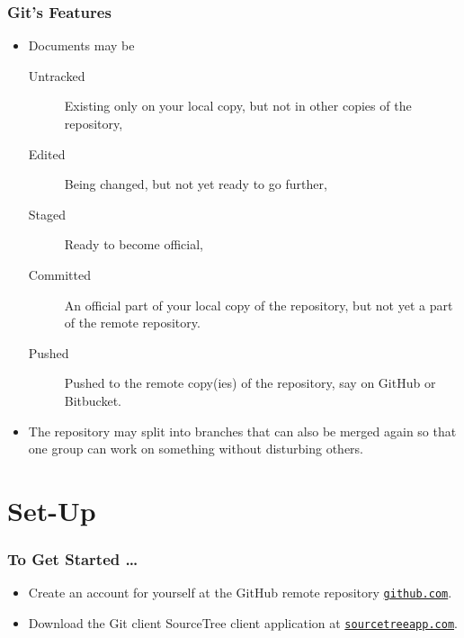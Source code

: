 \documentclass[12pt, compress,xcolor={usenames,dvipsnames}]{beamer} %
\begin{document}
	\begin{frame}\frametitle{Git's Features}

		\vspace{-3ex}
		
		\begin{itemize}
						
			\item Documents may be
			
			\begin{description}
				\item[Untracked] Existing only on your local copy, but not in other copies of the repository,
				
				\item [Edited] Being changed, but not yet ready to go further,
				
				\item[Staged] Ready to become official,
				
				\item[Committed] An official part of your local copy of the repository, but not yet a part of the remote repository.
				
				\item[Pushed] Pushed to the remote copy(ies) of the repository, say on GitHub or Bitbucket.  
			\end{description}
			
			\item The repository may split into \alert{branches} that can also be merged again so that one group can work on something without disturbing others.
			
			
		\end{itemize}
		
	\end{frame}

\section{Set-Up}

\begin{frame}\frametitle{To Get Started \ldots}
	
	\vspace{-4ex}

\begin{itemize}
	
	\item Create an account for yourself at the GitHub remote repository \href{http://github.com}{\nolinkurl{github.com}}.
	
	\item Download the Git client SourceTree client application at \href{http://sourcetreeapp.com}{\nolinkurl{sourcetreeapp.com}}.
	
\end{itemize}

\end{frame}
\end{document}
